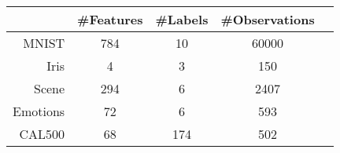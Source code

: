 \begin{tabular}{r|cccc}
& \#Features & \#Labels & \#Observations \\
\hline
MNIST & 784 & 10 & 60000 \\
Iris & 4 & 3 & 150 \\
Scene & 294 & 6 & 2407 \\
Emotions & 72 & 6 & 593 \\
CAL500 & 68 & 174 & 502 \\
\end{tabular}
